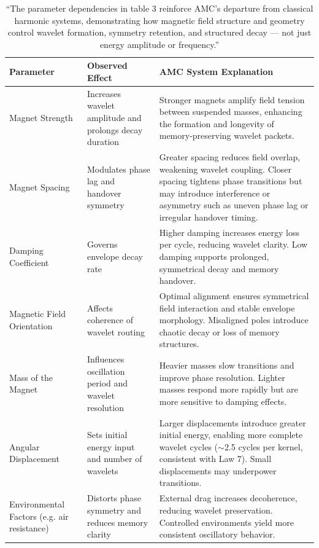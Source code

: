 \documentclass[10pt,aps,pre,onecolumn,superscriptaddress,notitlepage]{revtex4-2}
\begin{document}
\begin{table}[htbp]
\centering
\begin{tabular}{|p{4cm}|p{5cm}|p{8cm}|}
\hline
\textbf{Parameter} & \textbf{Observed Effect} & \textbf{AMC System Explanation} \\
\hline
Magnet Strength & Increases wavelet amplitude and \- prolongs decay duration & Stronger magnets amplify field tension between suspended masses, enhancing the formation and longevity of memory-preserving wavelet packets. \\
\hline
Magnet Spacing & Modulates phase lag and handover symmetry & Greater spacing reduces field overlap, weakening wavelet coupling. Closer spacing tightens phase transitions but may introduce interference or asymmetry such as uneven phase lag or irregular handover timing. \\
\hline
Damping Coefficient & Governs envelope decay rate & Higher damping increases energy loss per cycle, reducing wavelet clarity. Low damping supports prolonged, symmetrical decay and memory handover. \\
\hline
Magnetic Field Orientation & Affects coherence of wavelet routing & Optimal alignment ensures symmetrical field interaction and stable envelope morphology. Misaligned poles introduce chaotic decay or loss of memory structures. \\
\hline
Mass of the Magnet & Influences oscillation period and \- wavelet resolution & Heavier masses slow transitions and improve phase resolution. Lighter masses respond more rapidly but are more sensitive to damping effects. \\
\hline
Angular Displacement & Sets initial energy input and number of wavelets & Larger displacements introduce greater initial energy, enabling more complete wavelet cycles ($\sim$2.5 cycles per kernel, consistent with Law 7). Small displacements may underpower transitions. \\
\hline
Environmental Factors (e.g. air resistance) & Distorts phase symmetry and reduces memory clarity & External drag increases decoherence, reducing wavelet preservation. Controlled environments yield more consistent oscillatory behavior. \\
\hline
\end{tabular}
\caption{``The parameter dependencies in table 3 reinforce AMC’s departure from classical harmonic systems, demonstrating how magnetic field structure and geometry control wavelet formation, symmetry retention, and structured decay — not just energy amplitude or frequency.''}
\end{table}
\fussy
\end{document}
